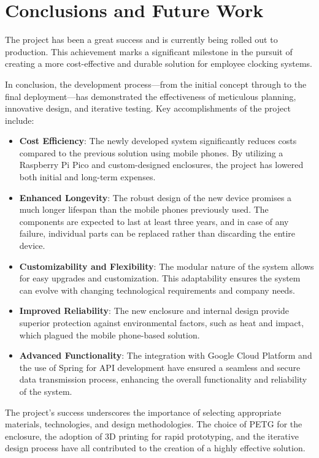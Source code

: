 \chapter{Conclusions and Future Work}
\label{cap:conclusions}

The project has been a great success and is currently being rolled out to production. This 
achievement marks a significant milestone in the pursuit of creating a more cost-effective and 
durable solution for employee clocking systems.

In conclusion, the development process—from the initial concept through to the final 
deployment—has demonstrated the effectiveness of meticulous planning, innovative design, and 
iterative testing. Key accomplishments of the project include:

\begin{itemize}
    \item \textbf{Cost Efficiency}: The newly developed system significantly reduces costs 
    compared to the previous solution using mobile phones. By utilizing a Raspberry Pi Pico and 
    custom-designed enclosures, the project has lowered both initial and long-term expenses.
    \item \textbf{Enhanced Longevity}: The robust design of the new device promises a much longer 
    lifespan than the mobile phones previously used. The components are expected to last at least 
    three years, and in case of any failure, individual parts can be replaced rather than 
    discarding the entire device.
    \item \textbf{Customizability and Flexibility}: The modular nature of the system allows for 
    easy upgrades and customization. This adaptability ensures the system can evolve with changing 
    technological requirements and company needs.
    \item \textbf{Improved Reliability}: The new enclosure and internal design provide superior 
    protection against environmental factors, such as heat and impact, which plagued the mobile 
    phone-based solution.
    \item \textbf{Advanced Functionality}: The integration with Google Cloud Platform and the use 
    of Spring for API development have ensured a seamless and secure data transmission process, 
    enhancing the overall functionality and reliability of the system.
\end{itemize}

The project's success underscores the importance of selecting appropriate materials, technologies, 
and design methodologies. The choice of PETG for the enclosure, the adoption of 3D printing for 
rapid prototyping, and the iterative design process have all contributed to the creation of a 
highly effective solution.

